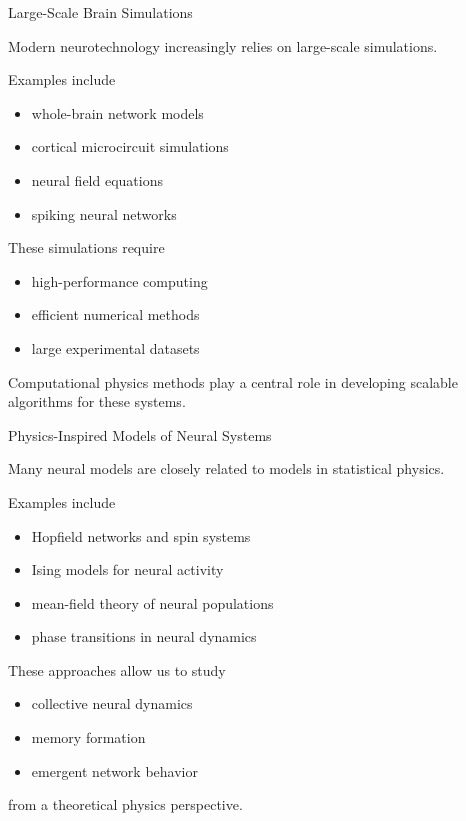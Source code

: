 \documentclass{beamer}
\begin{document}

\begin{frame}{Large-Scale Brain Simulations}

Modern neurotechnology increasingly relies on large-scale simulations.

Examples include

\begin{itemize}
\item whole-brain network models
\item cortical microcircuit simulations
\item neural field equations
\item spiking neural networks
\end{itemize}

These simulations require

\begin{itemize}
\item high-performance computing
\item efficient numerical methods
\item large experimental datasets
\end{itemize}

Computational physics methods play a central role in
developing scalable algorithms for these systems.

\end{frame}


\begin{frame}{Physics-Inspired Models of Neural Systems}

Many neural models are closely related to models in statistical physics.

Examples include

\begin{itemize}
\item Hopfield networks and spin systems
\item Ising models for neural activity
\item mean-field theory of neural populations
\item phase transitions in neural dynamics
\end{itemize}

These approaches allow us to study

\begin{itemize}
\item collective neural dynamics
\item memory formation
\item emergent network behavior
\end{itemize}

from a theoretical physics perspective.

\end{frame}
\end{document}
